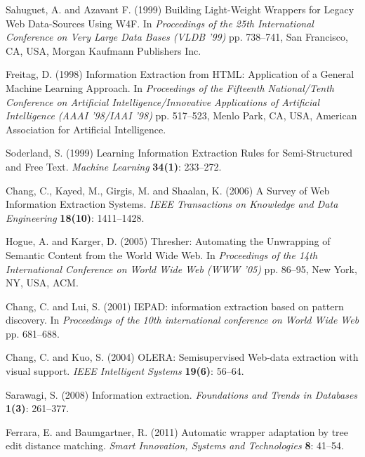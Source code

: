 \documentclass{nle}
\begin{document}
\begin{thebibliography}{}
Sahuguet, A. and Azavant F. (1999)
Building Light-Weight Wrappers for Legacy Web Data-Sources Using W4F.
In {\it Proceedings of the 25th International Conference on Very Large Data Bases (VLDB '99)}
pp. 738--741, San Francisco, CA, USA, Morgan Kaufmann Publishers Inc.

Freitag, D. (1998)
Information Extraction from HTML: Application of a General Machine Learning Approach.
In {\it Proceedings of the Fifteenth National/Tenth Conference on Artificial Intelligence/Innovative Applications of Artificial Intelligence (AAAI '98/IAAI '98)}
pp. 517--523, Menlo Park, CA, USA, American Association for Artificial Intelligence.

Soderland, S. (1999)
Learning Information Extraction Rules for Semi-Structured and Free Text.
{\it Machine Learning} 
{\bf 34(1)}: 233--272.

Chang, C., Kayed, M., Girgis, M. and Shaalan, K. (2006)
A Survey of Web Information Extraction Systems.
{\it IEEE Transactions on Knowledge and Data Engineering}
{\bf 18(10)}: 1411--1428.

Hogue, A. and Karger, D. (2005)
Thresher: Automating the Unwrapping of Semantic Content from the World Wide Web.
In {\it Proceedings of the 14th International Conference on World Wide Web (WWW '05)}
pp. 86--95, New York, NY, USA, ACM.

Chang, C. and Lui, S. (2001)
IEPAD: information extraction based on pattern discovery.
In {\it Proceedings of the 10th international conference on World Wide Web}
pp. 681--688.

Chang, C. and Kuo, S. (2004)
OLERA: Semisupervised Web-data extraction with visual support.
{\it IEEE Intelligent Systems}
{\bf 19(6)}: 56--64.

Sarawagi, S. (2008)
Information extraction.
{\it Foundations and Trends in Databases}
{\bf 1(3)}: 261--377.

Ferrara, E. and Baumgartner, R. (2011)
Automatic wrapper adaptation by tree edit distance matching.
{\it Smart Innovation, Systems and Technologies}
{\bf 8}: 41--54.


\end{thebibliography}
\end{document}
